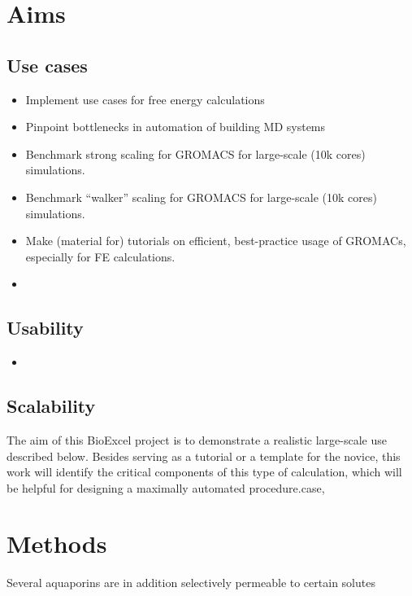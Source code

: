 \documentclass[11pt,a4paper]{article}
\begin{document}
\section{Aims}
\subsection{Use cases}

\begin{itemize}
\item Implement use cases for free energy calculations 
\item Pinpoint bottlenecks in automation of building MD systems
\item Benchmark strong scaling for GROMACS for large-scale (10k cores) simulations.
\item Benchmark ``walker'' scaling for GROMACS for large-scale (10k cores) simulations.
\item Make (material for) tutorials on efficient, best-practice usage of GROMACs, especially for FE calculations.


\item 

\end{itemize}

\subsection{Usability}
\begin{itemize}
\item 
\end{itemize}


\subsection{Scalability}

The aim of this BioExcel project  is to  demonstrate a realistic large-scale use described below. Besides serving as a tutorial or a template for the novice, this work will identify the critical components of this type of calculation, which will be helpful for designing a maximally automated procedure.case, 
\section{Methods}
Several aquaporins are in addition selectively permeable to certain solutes 
\end{document}
